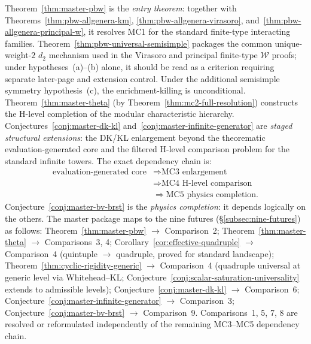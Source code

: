 \begin{remark}\label{rem:master-conjecture-hierarchy}
Theorem~\ref{thm:master-pbw} is the \emph{entry theorem}: together
with Theorems~\ref{thm:pbw-allgenera-km},
\ref{thm:pbw-allgenera-virasoro},
and~\ref{thm:pbw-allgenera-principal-w},
it resolves MC1 for the standard finite-type interacting families.
Theorem~\ref{thm:pbw-universal-semisimple} packages the common
unique-weight-$2$ $d_2$ mechanism used in the Virasoro and principal
finite-type $\mathcal{W}$ proofs; under hypotheses~(a)--(b) alone, it
should be read as a criterion requiring separate later-page and
extension control.  Under the additional semisimple symmetry
hypothesis~(c), the enrichment-killing is unconditional.
Theorem~\ref{thm:master-theta} (by Theorem~\ref{thm:mc2-full-resolution}) constructs the H-level
completion of the modular characteristic hierarchy.
Conjectures~\ref{conj:master-dk-kl}
and~\ref{conj:master-infinite-generator} are
\emph{staged structural extensions}: the DK/KL enlargement beyond the
theorematic evaluation-generated core and the filtered H-level
comparison problem for the
standard infinite towers.
The exact dependency chain is:
\[
\begin{aligned}
\text{evaluation-generated core}
&\Longrightarrow \text{MC3 enlargement}\\
&\Longrightarrow \text{MC4 H-level comparison}\\
&\Longrightarrow \text{MC5 physics completion}.
\end{aligned}
\]
Conjecture~\ref{conj:master-bv-brst} is the
\emph{physics completion}: it depends logically on the others.
The master package maps to the nine futures
(\S\ref{subsec:nine-futures}) as follows:
Theorem~\ref{thm:master-pbw} $\to$ Comparison~2;
Theorem~\ref{thm:master-theta} $\to$ Comparisons~3, 4;
Corollary~\ref{cor:effective-quadruple} $\to$ Comparison~4
(quintuple $\to$ quadruple, proved for standard landscape);
Theorem~\ref{thm:cyclic-rigidity-generic} $\to$ Comparison~4
(quadruple universal at generic level via Whitehead--KL;
Conjecture~\ref{conj:scalar-saturation-universality} extends
to admissible levels);
Conjecture~\ref{conj:master-dk-kl} $\to$ Comparison~6;
Conjecture~\ref{conj:master-infinite-generator} $\to$ Comparison~3;
Conjecture~\ref{conj:master-bv-brst} $\to$ Comparison~9.
Comparisons~1, 5, 7, 8 are resolved or reformulated independently of the
remaining MC3--MC5 dependency chain.
\end{remark}

